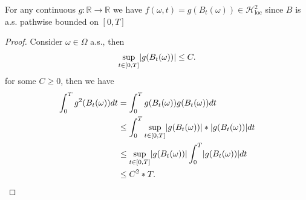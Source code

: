 \spewnotes
\begin{remark}[3.12]
  For any continuous $g: \mathbb{R}\to \mathbb{R}$  we have $f(\omega ,t) = g(B_t(\omega )) \in  \mathcal{H}^{2}_{\text{loc}} $  since $B$ is a.s. pathwise
  bounded on $[0,T]$
\end{remark}
\begin{proof}
 Consider $\omega \in  \Omega $ a.s., then 
 \begin{align*}
   \sup_{t \in  [0,T]}\lvert g(B_t(\omega ))\rvert \le C 
 .\end{align*}
 for some $C\ge 0$, then we have 
\begin{align*}
  \int_0^{T}  g^2(B_t(\omega )) dt &=  \int_0^{T}  g(B_t(\omega ))g(B_t(\omega)) dt\\
                                   &\le \int_0^{T}  \sup_{t \in  [0,T]} \lvert g(B_t(\omega ))\rvert* \lvert g(B_t(\omega))\rvert dt\\
                                   &\le  \sup_{t \in  [0,T]} \lvert g(B_t(\omega ))\rvert\int_0^{T} \lvert g(B_t(\omega))\rvert dt\\
                                   &\le C^2*T 
.\end{align*}
\end{proof}
